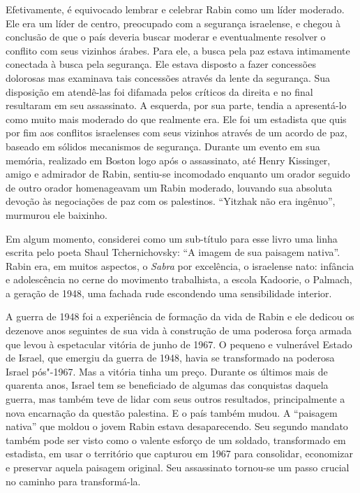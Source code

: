 Efetivamente, é equivocado lembrar e celebrar Rabin como um líder
moderado. Ele era um líder de centro, preocupado com a segurança
israelense, e chegou à conclusão de que o país deveria buscar moderar e
eventualmente resolver o conflito com seus vizinhos árabes. Para ele, a
busca pela paz estava intimamente conectada à busca pela segurança. Ele
estava disposto a fazer concessões dolorosas mas examinava tais
concessões através da lente da segurança. Sua disposição em atendê-las
foi difamada pelos críticos da direita e no final resultaram em seu
assassinato. A esquerda, por sua parte, tendia a apresentá-lo como muito
mais moderado do que realmente era. Ele foi um estadista que quis por
fim aos conflitos israelenses com seus vizinhos através de um acordo de
paz, baseado em sólidos mecanismos de segurança. Durante um evento em
sua memória, realizado em Boston logo após o assassinato, até Henry
Kissinger, amigo e admirador de Rabin, sentiu-se incomodado enquanto um orador
seguido de outro orador homenageavam um Rabin moderado, louvando sua absoluta devoção
às negociações de paz com os palestinos. ``Yitzhak não era ingênuo'',
murmurou ele baixinho.

Em algum momento, considerei como um sub-título para esse livro uma linha
escrita pelo poeta Shaul Tchernichovsky: ``A imagem de sua paisagem
nativa''. Rabin era, em muitos aspectos, o \emph{Sabra} por excelência, o
israelense nato: infância e adolescência no cerne do movimento
trabalhista, a escola Kadoorie, o Palmach, a geração de 1948, uma
fachada rude escondendo uma sensibilidade interior.

A guerra de 1948 foi a experiência de formação da vida de Rabin e ele
dedicou os dezenove anos seguintes de sua vida à construção de uma poderosa
força armada que levou à espetacular vitória de junho de 1967. O pequeno
e vulnerável Estado de Israel, que emergiu da guerra de 1948, havia se
transformado na poderosa Israel pós"-1967. Mas a vitória tinha um preço.
Durante os últimos mais de quarenta anos, Israel tem se beneficiado de
algumas das conquistas daquela guerra, mas também teve de lidar com
seus outros resultados, principalmente a nova encarnação da questão
palestina. E o país também mudou. A ``paisagem nativa'' que moldou o
jovem Rabin estava desaparecendo. Seu segundo mandato também pode ser
visto como o valente esforço de um soldado, transformado em estadista,
em usar o território que capturou em 1967 para consolidar, economizar e
preservar aquela paisagem original. Seu assassinato tornou-se um passo
crucial no caminho para transformá-la.

